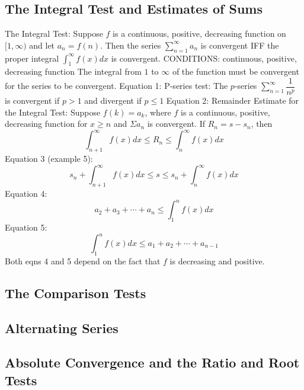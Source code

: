 \documentclass{article}
\begin{document}
    \subsection{The Integral Test and Estimates of Sums}
    \begin{outline}
        \1 The Integral Test: Suppose $f$ is a continuous, positive, decreasing function on \([1,\infty)\) and let \(a_n=f(n)\). Then the series \(\sum^\infty_{n=1}a_n\) is convergent IFF the proper integral \(\int^\infty_1f(x)dx\) is convergent. 
            \2 CONDITIONS: continuous, positive, decreasing function 
            \2 The integral from $1$ to $\infty$ of the function must be convergent for the series to be convergent. 
        \1 Equation 1: P-series test: The $p$-series \(\sum^\infty_{n=1}\dfrac{1}{n^p}\) is convergent if \(p>1\) and divergent if \(p\leq1\)
        \1 Equation 2: Remainder Estimate for the Integral Test: Suppose \(f(k)=a_k\), where $f$ is a continuous, positive, decreasing function for \(x\geq n\) and \(\Sigma a_n\) is convergent. If \(R_n=s-s_n\), then \[\int^\infty_{n+1}f(x)dx\leq R_n\leq\int^\infty_n f(x)dx\]
        \1 Equation 3 (example 5): \[s_n+\int^\infty_{n+1}f(x)dx\leq s\leq s_n+\int^\infty_nf(x)dx\]
        \1 Equation 4: \[a_2+a_3+\cdots+a_n\leq\int^n_1f(x)dx\]
        \1 Equation 5: \[\int^n_1f(x)dx\leq a_1+a_2+\cdots+a_{n-1}\]
            \2 Both eqns 4 and 5 depend on the fact that $f$ is decreasing and positive. 
    \end{outline}
    \subsection{The Comparison Tests}
    \begin{outline}
        
    \end{outline}
    \subsection{Alternating Series}
    \begin{outline}
        
    \end{outline}
    \subsection{Absolute Convergence and the Ratio and Root Tests}
    \begin{outline}
        
    \end{outline}
\end{document}
